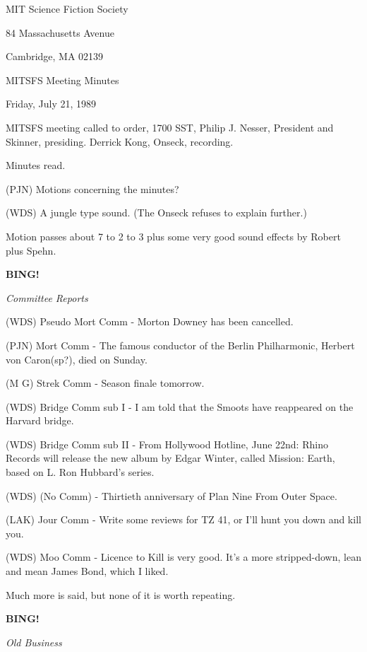\documentclass[12pt]{article}
\newcommand{\bing}{{\bf BING!} }
\newcommand{\goto}[1]{\bing \vskip 12pt \centerline{{\em{#1}}}}
\begin{document}
\begin{center}

MIT Science Fiction Society 

84 Massachusetts Avenue

Cambridge, MA 02139

\vspace{12pt}

MITSFS Meeting Minutes 

Friday, July 21, 1989

\end{center}
 
\vspace{18pt}

\setlength{\parskip}{6pt}

\noindent
MITSFS meeting called to order, 1700 SST, Philip J. Nesser, President and Skinner, presiding. Derrick Kong, Onseck, recording.

Minutes read.

(PJN) Motions concerning the minutes?

(WDS) A jungle type sound. (The Onseck refuses to explain further.)

Motion passes about 7 to 2 to 3 plus some very good sound effects by Robert plus Spehn.

\goto{Committee Reports}

(WDS)  Pseudo Mort Comm - Morton Downey has been cancelled.

(PJN) Mort Comm - The famous conductor of the Berlin
Philharmonic, Herbert von Caron(sp?), died on Sunday.

(M G) Strek Comm - Season finale tomorrow.

(WDS) Bridge Comm sub I - I am told that the Smoots have reappeared on the Harvard bridge.

(WDS) Bridge Comm sub II - From Hollywood Hotline, June 22nd: Rhino Records will release the new album by Edgar Winter, called Mission: Earth, based on L. Ron Hubbard's series.

(WDS) (No Comm) - Thirtieth anniversary of Plan Nine From Outer Space.

(LAK) Jour Comm - Write some reviews for TZ 41, or I'll hunt you down and kill you.

(WDS) Moo Comm - Licence to Kill is very good.  It's a more stripped-down, lean and mean James Bond, which I liked.

Much more is said, but none of it is worth repeating.

\goto{Old Business}
\end{document}
